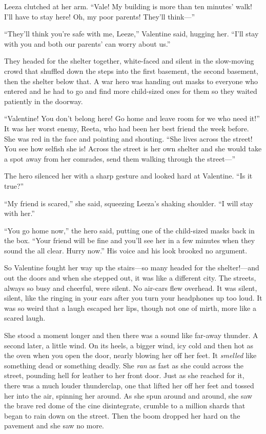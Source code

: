 Leeza clutched at her arm. “Vale! My building is more than ten
minutes’ walk! I’ll have to stay here! Oh, my poor parents! They’ll
think—”

“They’ll think you’re safe with me, Leeze,” Valentine said, hugging
her. “I’ll stay with you and both our parents’ can worry about
us.”

They headed for the shelter together, white-faced and silent in the
slow-moving crowd that shuffled down the steps into the first
basement, the second basement, then the shelter below that. A war
hero was handing out masks to everyone who entered and he had to go
and find more child-sized ones for them so they waited patiently in
the doorway.

“Valentine! You don’t belong here! Go home and leave room for we
who need it!” It was her worst enemy, Reeta, who had been her best
friend the week before. She was red in the face and pointing and
shouting. “She lives across the street! You see how selfish she is!
Across the street is her own shelter and she would take a spot away
from her comrades, send them walking through the street—”

The hero silenced her with a sharp gesture and looked hard at
Valentine. “Is it true?”

“My friend is scared,” she said, squeezing Leeza’s shaking
shoulder. “I will stay with her.”

“You go home now,” the hero said, putting one of the child-sized
masks back in the box. “Your friend will be fine and you’ll see her
in a few minutes when they sound the all clear. Hurry now.” His
voice and his look brooked no argument.

So Valentine fought her way up the stairs—so many headed for the
shelter!—and out the doors and when she stepped out, it was like a
different city. The streets, always so busy and cheerful, were
silent. No air-cars flew overhead. It was silent, silent, like the
ringing in your ears after you turn your headphones up too loud. It
was so weird that a laugh escaped her lips, though not one of
mirth, more like a scared laugh.

She stood a moment longer and then there was a sound like far-away
thunder. A second later, a little wind. On its heels, a bigger
wind, icy cold and then hot as the oven when you open the door,
nearly blowing her off her feet. It \emph{smelled} like something
dead or something deadly. She \emph{ran} as fast as she could
across the street, pounding hell for leather to her front door.
Just as she reached for it, there was a much louder thunderclap,
one that lifted her off her feet and tossed her into the air,
spinning her around. As she spun around and around, she saw the
brave red dome of the cine disintegrate, crumble to a million
shards that began to rain down on the street. Then the boom dropped
her hard on the pavement and she saw no more.

